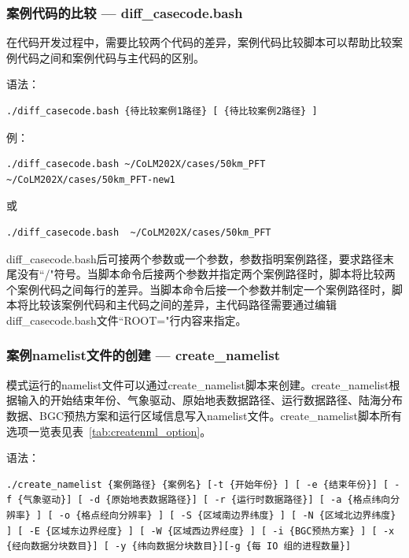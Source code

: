 \subsubsection{案例代码的比较 --- diff\_casecode.bash}

在代码开发过程中，需要比较两个代码的差异，案例代码比较脚本可以帮助比较案例代码之间和案例代码与主代码的区别。

语法：

\begin{lstlisting}[xleftmargin=2.5em]
./diff_casecode.bash {待比较案例1路径} [ {待比较案例2路径} ]
\end{lstlisting}

例：
\begin{lstlisting}[xleftmargin=2.5em]
./diff_casecode.bash ~/CoLM202X/cases/50km_PFT ~/CoLM202X/cases/50km_PFT-new1
\end{lstlisting}
或
\begin{lstlisting}[xleftmargin=2.5em]
./diff_casecode.bash  ~/CoLM202X/cases/50km_PFT
\end{lstlisting}

diff\_casecode.bash后可接两个参数或一个参数，参数指明案例路径，要求路径末尾没有``/"符号。当脚本命令后接两个参数并指定两个案例路径时，脚本将比较两个案例代码之间每行的差异。当脚本命令后接一个参数并制定一个案例路径时，脚本将比较该案例代码和主代码之间的差异，主代码路径需要通过编辑diff\_casecode.bash文件``ROOT="行内容来指定。

\subsubsection{案例namelist文件的创建 --- create\_namelist}

模式运行的namelist文件可以通过create\_namelist脚本来创建。create\_namelist根据输入的开始结束年份、气象驱动、原始地表数据路径、运行数据路径、陆海分布数据、BGC预热方案和运行区域信息写入namelist文件。create\_namelist脚本所有选项一览表见表~\ref{tab:createnml_option}。

语法：
\begin{lstlisting}[xleftmargin=2.5em]
./create_namelist {案例路径} {案例名} [-t {开始年份} ] [ -e {结束年份}] [ -f {气象驱动}] [ -d {原始地表数据路径}] [ -r {运行时数据路径}] [ -a {格点纬向分辨率} ] [ -o {格点经向分辨率} ] [ -S {区域南边界纬度} ] [ -N {区域北边界纬度} ] [ -E {区域东边界经度} ] [ -W {区域西边界经度} ] [ -i {BGC预热方案} ] [ -x {经向数据分块数目}] [ -y {纬向数据分块数目}][-g {每 IO 组的进程数量}]
\end{lstlisting}

